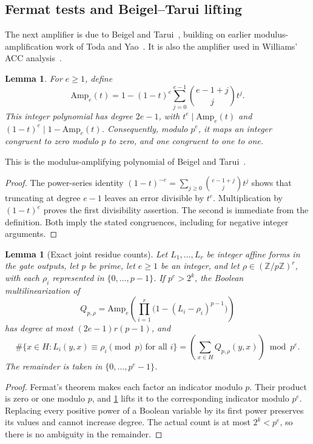 \documentclass[11pt,letterpaper]{article}
\newtheorem{lemma}[theorem]{Lemma}
\theoremstyle{definition}
\theoremstyle{remark}
\newcommand{\Z}{\mathbb Z}
\newcommand{\Amp}{\mathrm{Amp}}
\begin{document}
\subsection{Fermat tests and Beigel--Tarui lifting}

The next amplifier is due to Beigel and Tarui~\cite{BT94}, building on
earlier modulus-amplification work of Toda and Yao~\cite{Tod91,Yao90}. It is also the
amplifier used in Williams' ACC analysis~\cite{WilACC14}.
\begin{lemma}\label{lem:amp}
For \(e\ge1\), define
\[
 \Amp_e(t)=1-(1-t)^e\sum_{j=0}^{e-1}\binom{e-1+j}{j}t^j.
\]
This integer polynomial has degree \(2e-1\), with
\(t^e\mid\Amp_e(t)\) and \((1-t)^e\mid1-\Amp_e(t)\).
Consequently, modulo \(p^e\), it maps an integer congruent to zero
modulo \(p\) to zero, and one congruent to one to one.
\end{lemma}
This is the modulus-amplifying polynomial of Beigel and
Tarui~\cite[Section~2.3]{BT94}.
\begin{proof}
The power-series identity
\((1-t)^{-e}=\sum_{j\ge0}\binom{e-1+j}{j}t^j\) shows that truncating
at degree \(e-1\) leaves an error divisible by \(t^e\).
Multiplication by \((1-t)^e\) proves the first divisibility assertion.
The second is immediate from the definition. Both imply the stated
congruences, including for negative integer arguments.
\end{proof}

\begin{lemma}[Exact joint residue counts]\label{lem:residue-count}
Let \(L_1,\ldots,L_r\) be integer affine forms in the gate outputs,
let \(p\) be prime, let \(e\ge1\) be an integer, and let
\(\rho\in(\Z/p\Z)^r\), with each \(\rho_i\) represented in
\(\{0,\ldots,p-1\}\). If \(p^e>2^k\),
the Boolean multilinearization of
\[
 Q_{p,\rho}
 =\Amp_e\!\left(\prod_{i=1}^r
              \bigl(1-(L_i-\rho_i)^{p-1}\bigr)\right)
\]
has degree at most \((2e-1)r(p-1)\), and
\[
 \#\{x\in H:L_i(y,x)\equiv\rho_i\pmod p\text{ for all }i\}
 =\left(\sum_{x\in H}Q_{p,\rho}(y,x)\right)\bmod p^e.
\]
The remainder is taken in \(\{0,\ldots,p^e-1\}\).
\end{lemma}
\begin{proof}
Fermat's theorem makes each factor an indicator modulo \(p\).
Their product is zero or one modulo \(p\), and \cref{lem:amp} lifts
it to the corresponding indicator modulo \(p^e\). Replacing every
positive power of a Boolean variable by its first power preserves
its values and cannot increase degree. The actual count is at most
\(2^k<p^e\), so there is no ambiguity in the remainder.
\end{proof}
\end{document}
